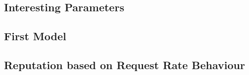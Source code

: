 \subsection{Interesting Parameters}
\subsection{First Model}
\subsection{Reputation based on Request Rate Behaviour}